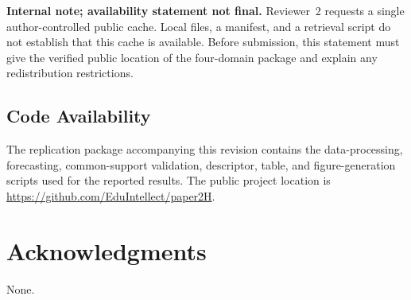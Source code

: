 \documentclass[pdflatex]{sn-jnl}
\begin{document}
\textbf{Internal note; availability statement not final.} Reviewer~2
requests a single author-controlled public cache. Local files, a manifest,
and a retrieval script do not establish that this cache is available.
Before submission, this statement must give the verified public location
of the four-domain package and explain any redistribution restrictions.

\subsection*{Code Availability}
The replication package accompanying this revision contains the data-processing,
forecasting, common-support validation, descriptor, table, and figure-generation
scripts used for the reported results. The public project location is
\url{https://github.com/EduIntellect/paper2H}.

\section*{Acknowledgments}
None.


\begingroup
{}


\endgroup
\end{document}
